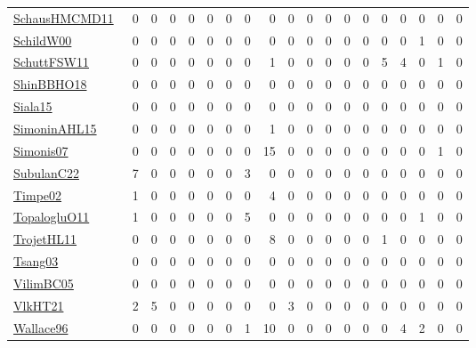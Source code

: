 {\begin{longtable}{l*{18}{r}}
\href{articles/SchausHMCMD11.pdf}{SchausHMCMD11}~\cite{SchausHMCMD11} & 0 & 0 & 0 & 0 & 0 & 0 & 0 & 0 & 0 & 0 & 0 & 0 & 0 & 0 & 0 & 0 & 0 & 0\\
\href{articles/SchildW00.pdf}{SchildW00}~\cite{SchildW00} & 0 & 0 & 0 & 0 & 0 & 0 & 0 & 0 & 0 & 0 & 0 & 0 & 0 & 0 & 0 & 1 & 0 & 0\\
\href{articles/SchuttFSW11.pdf}{SchuttFSW11}~\cite{SchuttFSW11} & 0 & 0 & 0 & 0 & 0 & 0 & 0 & 1 & 0 & 0 & 0 & 0 & 0 & 5 & 4 & 0 & 1 & 0\\
\href{articles/ShinBBHO18.pdf}{ShinBBHO18}~\cite{ShinBBHO18} & 0 & 0 & 0 & 0 & 0 & 0 & 0 & 0 & 0 & 0 & 0 & 0 & 0 & 0 & 0 & 0 & 0 & 0\\
\href{articles/Siala15.pdf}{Siala15}~\cite{Siala15} & 0 & 0 & 0 & 0 & 0 & 0 & 0 & 0 & 0 & 0 & 0 & 0 & 0 & 0 & 0 & 0 & 0 & 0\\
\href{articles/SimoninAHL15.pdf}{SimoninAHL15}~\cite{SimoninAHL15} & 0 & 0 & 0 & 0 & 0 & 0 & 0 & 1 & 0 & 0 & 0 & 0 & 0 & 0 & 0 & 0 & 0 & 0\\
\href{articles/Simonis07.pdf}{Simonis07}~\cite{Simonis07} & 0 & 0 & 0 & 0 & 0 & 0 & 0 & 15 & 0 & 0 & 0 & 0 & 0 & 0 & 0 & 0 & 1 & 0\\
\href{articles/SubulanC22.pdf}{SubulanC22}~\cite{SubulanC22} & 7 & 0 & 0 & 0 & 0 & 0 & 3 & 0 & 0 & 0 & 0 & 0 & 0 & 0 & 0 & 0 & 0 & 0\\
\href{articles/Timpe02.pdf}{Timpe02}~\cite{Timpe02} & 1 & 0 & 0 & 0 & 0 & 0 & 0 & 4 & 0 & 0 & 0 & 0 & 0 & 0 & 0 & 0 & 0 & 0\\
\href{articles/TopalogluO11.pdf}{TopalogluO11}~\cite{TopalogluO11} & 1 & 0 & 0 & 0 & 0 & 0 & 5 & 0 & 0 & 0 & 0 & 0 & 0 & 0 & 0 & 1 & 0 & 0\\
\href{articles/TrojetHL11.pdf}{TrojetHL11}~\cite{TrojetHL11} & 0 & 0 & 0 & 0 & 0 & 0 & 0 & 8 & 0 & 0 & 0 & 0 & 0 & 1 & 0 & 0 & 0 & 0\\
\href{articles/Tsang03.pdf}{Tsang03}~\cite{Tsang03} & 0 & 0 & 0 & 0 & 0 & 0 & 0 & 0 & 0 & 0 & 0 & 0 & 0 & 0 & 0 & 0 & 0 & 0\\
\href{articles/VilimBC05.pdf}{VilimBC05}~\cite{VilimBC05} & 0 & 0 & 0 & 0 & 0 & 0 & 0 & 0 & 0 & 0 & 0 & 0 & 0 & 0 & 0 & 0 & 0 & 0\\
\href{articles/VlkHT21.pdf}{VlkHT21}~\cite{VlkHT21} & 2 & 5 & 0 & 0 & 0 & 0 & 0 & 0 & 3 & 0 & 0 & 0 & 0 & 0 & 0 & 0 & 0 & 0\\
\href{articles/Wallace96.pdf}{Wallace96}~\cite{Wallace96} & 0 & 0 & 0 & 0 & 0 & 0 & 1 & 10 & 0 & 0 & 0 & 0 & 0 & 0 & 4 & 2 & 0 & 0\\

\end{longtable}}
